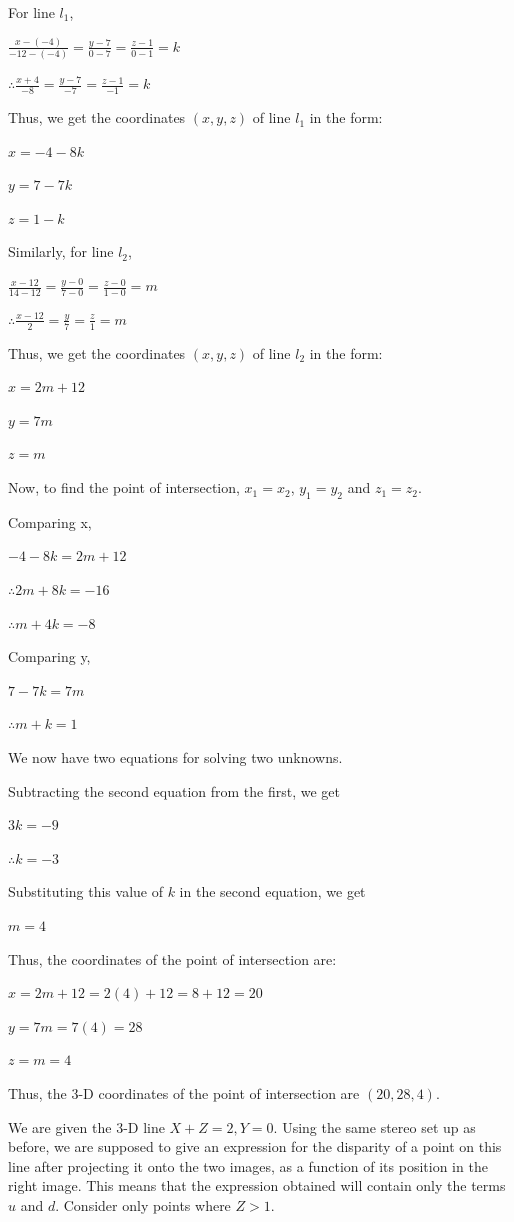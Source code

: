 \documentclass{assignment}
\begin{document}
\begin{problemlist}
\begin{legal}
For line $l_1$,

$\frac{x - (-4)}{-12 - (-4)} = \frac{y - 7}{0 - 7} = \frac{z - 1}{0 - 1} = k$

$\therefore \frac{x + 4}{-8} = \frac{y - 7}{-7} = \frac{z - 1}{-1} = k$

Thus, we get the coordinates $(x, y, z)$ of line $l_1$ in the form: 

$x = -4 - 8k$

$y = 7 - 7k$

$z = 1 - k$

Similarly, for line $l_2$,

$\frac{x - 12}{14 - 12} = \frac{y - 0}{7 - 0} = \frac{z - 0}{1 - 0} = m$

$\therefore \frac{x - 12}{2} = \frac{y}{7} = \frac{z}{1} = m$

Thus, we get the coordinates $(x, y, z)$ of line $l_2$ in the form:

$x = 2m + 12$

$y = 7m$

$z = m$

Now, to find the point of intersection, $x_1 = x_2$, $y_1 = y_2$ and $z_1 = z_2$.

Comparing x,

$-4 - 8k = 2m + 12$

$\therefore 2m + 8k = -16$

$\therefore m + 4k = -8$

Comparing y,

$7 - 7k = 7m$

$\therefore m + k = 1$

We now have two equations for solving two unknowns. 

Subtracting the second equation from the first, we get

$3k = -9$

$\therefore k = -3$

Substituting this value of $k$ in the second equation, we get

$m = 4$

Thus, the coordinates of the point of intersection are:

$x = 2m + 12 = 2(4) + 12 = 8 + 12 = 20$

$y = 7m = 7(4) = 28$

$z = m = 4$

Thus, the 3-D coordinates of the point of intersection are $(20, 28, 4)$.

\item We are given the 3-D line $X + Z = 2, Y = 0$. Using the same stereo set up as before, we are supposed to give an expression for the disparity of a point on this line after projecting it onto the two images, as a function of its position in the right image. This means that the expression obtained will contain only the terms $u$ and $d$. Consider only points where $Z > 1$.


\end{legal}
\end{problemlist}
\end{document}
